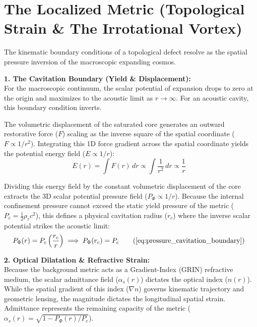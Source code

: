 \section{The Localized Metric (Topological Strain \& The Irrotational Vortex)}
\label{sec:deriv_localized_metric_strain}

The kinematic boundary conditions of a topological defect resolve as the spatial pressure inversion of the macroscopic expanding cosmos. 

\textbf{1. The Cavitation Boundary (Yield \& Displacement):} \\
For the macroscopic continuum, the scalar potential of expansion drops to zero at the origin and maximizes to the acoustic limit as $r \to \infty$. For an acoustic cavity, this boundary condition inverts. 

The volumetric displacement of the saturated core generates an outward restorative force ($F$) scaling as the inverse square of the spatial coordinate ($F \propto 1/r^2$). Integrating this 1D force gradient across the spatial coordinate yields the potential energy field ($E \propto 1/r$): %
\begin{equation}
    E(r) = \int F(r) \, dr \propto \int \frac{1}{r^2} \, dr \propto \frac{1}{r}
\end{equation}

Dividing this energy field by the constant volumetric displacement of the core extracts the 3D scalar potential pressure field ($P_\Phi \propto 1/r$). Because the internal confinement pressure cannot exceed the static yield pressure of the metric ($P_c = \frac{1}{2}\rho_{\tau} c^2$), this defines a physical cavitation radius ($r_c$) where the inverse scalar potential strikes the acoustic limit: 
\begin{equation}
    P_\Phi(r) = P_c \left( \frac{r_c}{r} \right) \implies P_\Phi(r_c) = P_c \tag{\ref{eq:pressure_cavitation_boundary}}
\end{equation}

\textbf{2. Optical Dilatation \& Refractive Strain:} \\
Because the background metric acts as a Gradient-Index (GRIN) refractive medium, the scalar admittance field ($\alpha_s(r)$) dictates the optical index ($n(r)$). While the spatial gradient of this index ($\nabla n$) governs kinematic trajectory and geometric lensing, the magnitude dictates the longitudinal spatial strain. Admittance represents the remaining capacity of the metric ($\alpha_s(r) = \sqrt{1 - P_\Phi(r) / P_c}$). 


